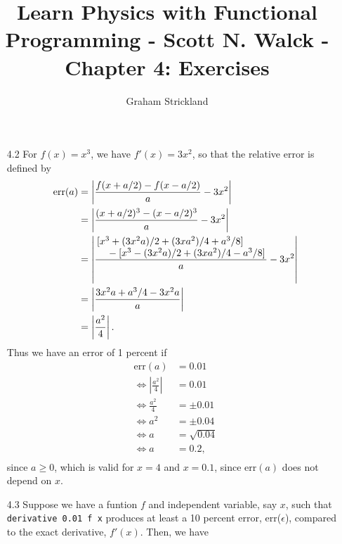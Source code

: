 \documentclass{article}
\title{Learn Physics with Functional Programming - Scott N. Walck - Chapter 4: Exercises}
\author{Graham Strickland}
\begin{document}
\maketitle  

\begin{itemize}
    \item[4.2]
    For $f(x) = x^3$, we have $f'(x) = 3x^2$, so that the relative error is defined by
    \begin{equation*}
        \begin{split}
            \text{err}(a) &= \left| \frac{f(x + a/2) - f(x - a/2)}{a} - 3x^2 \right| \\
            &= \left| \frac{(x + a/2)^3 - (x - a/2)^3}{a} - 3x^2 \right| \\
            &= \left| \frac{\splitfrac{[x^3 + (3x^2a)/2 + (3xa^2)/4 + a^3/8]}
                {{} - [x^3 - (3x^2a)/2 + (3xa^2)/4 - a^3/8]}}{a} - 3x^2 \right| \\
            &= \left| \frac{3x^2a + a^3/4 - 3x^2a}{a} \right| \\
            &= \left| \frac{a^2}{4} \right|.
        \end{split}
    \end{equation*}
    \qquad Thus we have an error of 1 percent if 
    \begin{equation*}
        \begin{split}
            \text{err}(a) &= 0.01 \\
            \Leftrightarrow \left|\frac{a^2}{4}\right| &= 0.01 \\
            \Leftrightarrow \frac{a^2}{4} &= \pm 0.01 \\
            \Leftrightarrow a^2 &= \pm 0.04 \\
            \Leftrightarrow a &= \sqrt{0.04} \\
            \Leftrightarrow a &= 0.2, \\
        \end{split}
    \end{equation*}
    since $a \geq 0$, which is valid for $x = 4$ and $x = 0.1$, since $\text{err}(a)$ does not 
    depend on $x$.
    \item[4.3]
    Suppose we have a funtion $f$ and independent variable, say $x$, such that 
    \verb|derivative 0.01 f x| produces at least a 10 percent error, err($\epsilon$), compared to 
    the exact derivative, $f'(x)$. Then, we have
    \begin{equation*}
        \begin{split}

\end{split}
\end{equation*}
\end{itemize}
\end{document}

